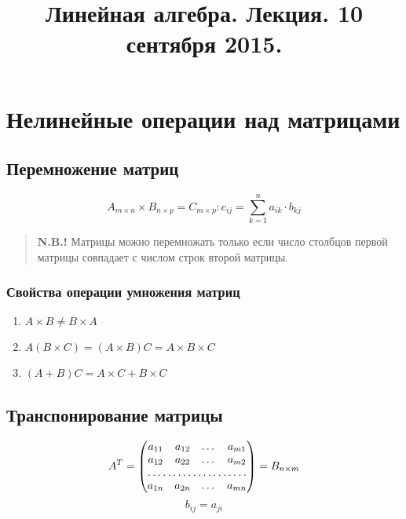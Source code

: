 \documentclass[11pt]{proc}
\title{Линейная алгебра. Лекция. 10 сентября 2015.}
\begin{document}
\pagestyle{empty}
\maketitle
\section{Нелинейные операции над матрицами}
\subsection{Перемножение матриц}
\[A_{m \times n} \times B_{n \times p} = C_{m \times p}: c_{ij} = \sum^n_{k=1}a_{ik} \cdot b_{kj}\]
\begin{quote}
	\textbf{N.B.!}
	Матрицы можно перемножать только если число столбцов первой матрицы совпадает с числом строк второй матрицы.
\end{quote}
\subsubsection{Свойства операции умножения матриц}
\begin{enumerate}
	\item{$A \times B \neq B \times A$}
	\item{$A(B \times C)=(A \times B)C = A \times B \times C$}
	\item{$(A + B)C = A \times C + B \times C$}
\end{enumerate}
\subsection{Транспонирование матрицы}
\[A^T=\begin{pmatrix}
	a_{11} & a_{12} & \dots & a_{m1} \\
	a_{12} & a_{22} & \dots &  a_{m2} \\
	\hdotsfor{4}\\
	a_{1n} & a_{2n} & \dots & a_{mn} 
\end{pmatrix} = B_{n \times m}\]
\[b_{ij} = a_{ji}\]
\end{document}
